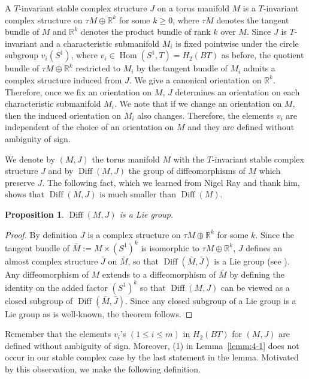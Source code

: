 \documentclass[12pt]{amsart}
\theoremstyle{plain} \numberwithin{equation}{section}
\newtheorem{prop}[theo]{Proposition}
\theoremstyle{definition}
\def\R{\mathbb R}
\DeclareMathOperator{\Diff}{Diff}
\DeclareMathOperator{\Hom}{Hom}
\begin{document}
A $T$-invariant stable complex structure $J$ on a torus manifold $M$ is a $T$-invariant complex structure on $\tau M\oplus\R^k$ for some $k\ge0$, where $\tau M$ denotes the tangent bundle of $M$ and $\R^k$ denotes the product bundle of rank $k$ over $M$.  
Since $J$ is $T$-invariant and a characteristic submanifold $M_i$ is fixed pointwise under the circle subgroup $v_i(S^1)$, where $v_i\in \Hom(S^1,T)=H_2(BT)$ as before, the quotient bundle of $\tau M\oplus\R^k$ restricted to $M_i$ by the tangent bundle of $M_i$ admits a complex structure induced from $J$.  We give a canonical orientation on $\R^k$.  Therefore, once we fix an orientation on $M$, $J$ determines an orientation on each characteristic submanifold $M_i$.  We note that if we change an orientation on $M$, then the induced orientation on $M_i$  also changes.  Therefore, the elements $v_i$ are independent of the choice of an orientation on $M$ and they are defined without ambiguity of sign.  

We denote by $(M,J)$ the torus manifold $M$ with the $T$-invariant stable complex structure $J$ and by $\Diff(M,J)$ the group of diffeomorphisms of $M$ which preserve $J$. The following fact, which we learned from Nigel Ray and thank him, shows that $\Diff(M,J)$ is much smaller than $\Diff(M)$. 

\begin{prop} \label{prop:5-1}
$\Diff(M,J)$ is a Lie group.
\end{prop}

\begin{proof}
By definition $J$ is a complex structure on $\tau M\oplus \R^k$ for some $k$.  Since the tangent bundle of  $\bar M:=M\times (S^1)^k$ is isomorphic to $\tau M\oplus\R^k$,  $J$ defines an almost complex structure $\bar J$ on $\bar M$,  so that $\Diff(\bar M,\bar J)$ is a Lie group (see \cite[Corollary 4.2 in p.19]{koba72}). Any diffeomorphism of $M$ extends to a diffeomorphism of $\bar M$ by defining the identity on the added factor $(S^1)^k$ so that $\Diff(M,J)$ can be viewed as a closed subgroup of $\Diff(\bar M,\bar J)$.  Since any closed subgroup of a Lie group is a Lie group as is well-known, the theorem follows.   
\end{proof}

Remember that the elements $v_i$'s $(1\le i\le m)$ in $H_2(BT)$ for $(M,J)$ are defined without ambiguity of sign.  Moreover, (1) in Lemma~\ref{lemm:4-1} does not occur in our stable complex case by the last statement in the lemma.  Motivated by this observation, we make the following definition.    
\end{document}
